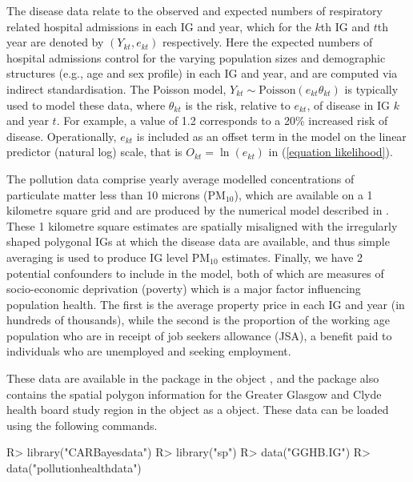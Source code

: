 \documentclass[article, nojss]{jss}
\begin{document}
\hspace{1cm} The disease data relate to the observed and expected numbers of respiratory related hospital admissions in each IG and year, which for the $k$th IG and $t$th year are denoted by $(Y_{kt}, e_{kt})$ respectively. Here the expected numbers of hospital admissions control for the varying population sizes and demographic structures (e.g., age and sex profile) in each IG and year, and are computed via indirect standardisation.  The Poisson  model, $Y_{kt}\sim\mbox{Poisson}(e_{kt}\theta_{kt})$ is typically used to model these data, where $\theta_{kt}$ is the risk, relative to $e_{kt}$, of disease in IG $k$ and year $t$. For example, a value of 1.2 corresponds to a 20\% increased risk of disease. Operationally, $e_{kt}$ is included as an offset term in the model on the linear predictor (natural log) scale, that is $O_{kt}=\ln(e_{kt})$ in (\ref{equation likelihood}). 

\hspace{1cm} The pollution data comprise yearly average modelled concentrations of particulate matter less than 10 microns (PM$_{10}$), which are available on a 1 kilometre square grid and are produced by the numerical  model described in \cite{ricardo2015}. These 1 kilometre square estimates are spatially misaligned with the irregularly shaped polygonal IGs at which the disease  data are available, and thus simple averaging is used to produce IG level PM$_{10}$ estimates. Finally, we have 2 potential confounders to include in the model, both of which are measures of socio-economic deprivation (poverty) which is a major factor influencing population health. The first is the average property price in each IG and year (in hundreds of thousands), while the second is the proportion of the working age population who are in receipt of job seekers allowance (JSA), a benefit paid to individuals who are unemployed and seeking employment.

\hspace{1cm} These data are available in the  package in the object , and the package also contains the spatial polygon information for the Greater Glasgow and Clyde health board study region in the object  as a  object. These data can be loaded using the following commands.




\begin{Schunk}
\begin{Sinput}
R>  library("CARBayesdata")
R>  library("sp")
R>  data("GGHB.IG")
R>  data("pollutionhealthdata")
\end{Sinput}
\end{Schunk}
\end{document}
